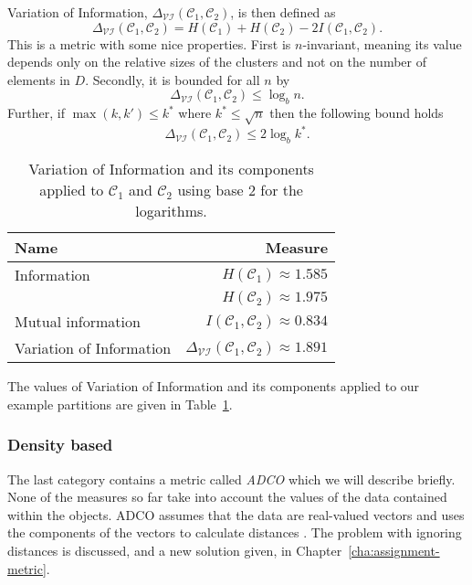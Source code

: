 \documentclass[a4paper]{report}
\newcommand{\dset}{D}
\newcommand{\clus}{\mathcal{C}}
\newcommand{\partcompare}[1]{\Delta_{\mathcal{#1}}(\clus_1,\clus_2)}
\begin{document}
Variation of Information, $\partcompare{VI}$, is then defined as
\begin{equation*}
  \partcompare{VI} = H(\clus_1) + H(\clus_2) - 2I(\clus_1,\clus_2).
\end{equation*}
This is a metric with some nice properties.  First is $n$-invariant, meaning
its value depends only on the relative sizes of the clusters and not on the
number of elements in $\dset$.  Secondly, it is bounded for all $n$ by
\begin{equation*}
  \partcompare{VI} \leq \log_b n.
\end{equation*}
Further, if $\max(k,k') \leq k^*$ where $k^* \leq \sqrt{n}$ then the following
bound holds
\begin{equation*}
  \partcompare{VI} \leq 2 \log_b k^*.
\end{equation*}

\begin{table}
  \centering
  \begin{tabular}{lr}
    \toprule
    Name & Measure \\
    \midrule
    Information & $H(\clus_1) \approx 1.585$ \\
                & $H(\clus_2) \approx 1.975$ \\
    Mutual information & $I(\clus_1,\clus_2) \approx 0.834$ \\
    Variation of Information & $\partcompare{VI} \approx 1.891$
    \\
    \bottomrule
  \end{tabular}
  \caption{Variation of Information and its components applied to $\clus_1$
    and $\clus_2$ using base 2 for the logarithms.}
  \label{tab:vi-comparison}
\end{table}

The values of Variation of Information and its components applied to our
example partitions are given in Table~\ref{tab:vi-comparison}.

\subsubsection{Density based}
\label{sec:density-based}

The last category contains a metric called \textit{ADCO} which we will
describe briefly.  None of the measures so far take into account the values of
the data contained within the objects.  ADCO assumes that the data are
real-valued vectors and uses the components of the vectors to calculate
distances \citep{bae2010comparison}.  The problem with ignoring distances is
discussed, and a new solution given, in Chapter~\ref{cha:assignment-metric}.
\end{document}
